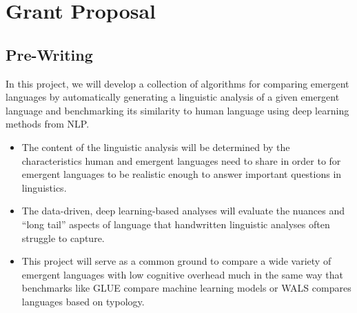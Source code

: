 \chapter{Grant Proposal}

\newpage
\section{Pre-Writing}



In this project, we will develop a collection of algorithms for comparing emergent languages by automatically
    generating a linguistic analysis of a given emergent language
    and benchmarking its similarity to human language using deep learning methods from NLP\@.
\begin{itemize}
    \item The content of the linguistic analysis will be determined by the characteristics human and emergent languages need to share in order to for emergent languages to be realistic enough to answer important questions in linguistics.
    \item The data-driven, deep learning-based analyses will evaluate the nuances and ``long tail'' aspects of language that handwritten linguistic analyses often struggle to capture.
    \item This project will serve as a common ground to compare a wide variety of emergent languages with low cognitive overhead much in the same way that
    benchmarks like GLUE compare machine learning models
    or WALS compares languages based on typology.
\end{itemize}

